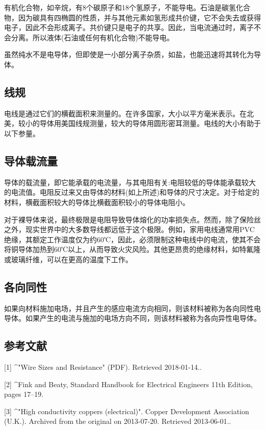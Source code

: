 有机化合物，如辛烷，有8个碳原子和18个氢原子，不能导电。石油是碳氢化合物，因为碳具有四椭圆的性质，并与其他元素如氢形成共价键，它不会失去或获得电子，因此不会形成离子。共价键只是电子的共享。因此，当电流通过时，离子不会分离。所以液体(石油或任何有机化合物)不能导电。

虽然纯水不是电导体，但即使是一小部分离子杂质，如盐，也能迅速将其转化为导体。

\subsection{线规}
电线是通过它们的横截面积来测量的。在许多国家，大小以平方毫米表示。在北美，较小的导体用美国线规测量，较大的导体用圆形密耳测量。电线的大小有助于以下参量。

\subsection{导体载流量}
导体的载流量，即它能承载的电流量，与其电阻有关:电阻较低的导体能承载较大的电流值。电阻反过来又由导体的材料(如上所述)和导体的尺寸决定。对于给定的材料，横截面积较大的导体比横截面积较小的导体电阻小。

对于裸导体来说，最终极限是电阻导致导体熔化的功率损失点。然而，除了保险丝之外，现实世界中的大多数导线都远低于这个极限。例如，家用电线通常用PVC绝缘，其额定工作温度仅为约60℃，因此，必须限制这种电线中的电流，使其不会将铜导体加热到60℃以上，从而导致火灾风险。其他更昂贵的绝缘材料，如特氟隆或玻璃纤维，可以在更高的温度下工作。

\subsection{各向同性}
如果向材料施加电场，并且产生的感应电流方向相同，则该材料被称为各向同性电导体。如果产生的电流与施加的电场方向不同，则该材料被称为各向异性电导体。

\subsection{参考文献}
[1]
^"Wire Sizes and Resistance" (PDF). Retrieved 2018-01-14..

[2]
^Fink and Beaty, Standard Handbook for Electrical Engineers 11th Edition, pages 17–19.

[3]
^"High conductivity coppers (electrical)". Copper Development Association (U.K.). Archived from the original on 2013-07-20. Retrieved 2013-06-01..